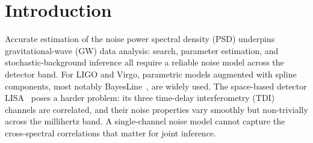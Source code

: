 \documentclass[%
	reprint,
	nofootinbib,
	amsmath,
	amssymb,
	aps,
]{revtex4-2}
\begin{document}
	\maketitle

	\section{\label{sec:intro}Introduction}

	Accurate estimation of the noise power spectral density (PSD) underpins
    gravitational-wave (GW) data analysis: search, parameter estimation, and
    stochastic-background inference all require a reliable noise model across
    the detector band. For LIGO and Virgo, parametric models augmented with
    spline components, most notably BayesLine~\citep{littenberg_bayesian_2015}, are widely used.
    The space-based detector LISA~\citep{Amaro-SeoanePau2017LISA} poses a harder problem: its three
    time-delay interferometry (TDI) channels are correlated, and their noise
    properties vary smoothly but non-trivially across the millihertz band.
    A single-channel noise model cannot capture the cross-spectral correlations
    that matter for joint inference.
     
\end{document}
